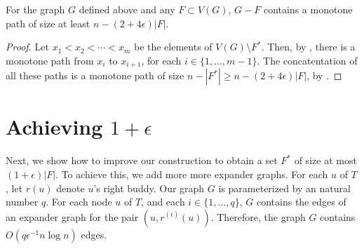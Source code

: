 \documentclass{patmorin}
\begin{document}
\begin{prop}
	For the graph $G$ defined above and any $F\subset V(G)$, $G-F$ contains a monotone path of size at least $n-(2+4\epsilon)|F|$.
\end{prop}

\begin{proof}
	Let $x_1<x_2<\cdots<x_m$ be the elements of $V(G)\setminus F^*$.
	Then, by , there is a monotone path from $x_i$
	to $x_{i+1}$, for each $i\in\{1,\ldots,m-1\}$.
	The concatentation of all these paths is a monotone path of size $n-|F^*| \ge n-(2+4\epsilon)|F|$, by .
\end{proof}

\section{Achieving $1+\epsilon$}


Next, we show how to improve our construction to obtain a set $F^*$
of size at most $(1+\epsilon)|F|$.  To achieve this, we add more more
expander graphs. For each $u$ of $T$, let $r(u)$ denote $u$'s right buddy.
Our graph $G$ is parameterized by an natural number $q$.  For each node
$u$ of $T$, and each $i\in\{1,\ldots,q\}$, $G$ contains the edges of an
expander graph for the pair $(u,r^{(i)}(u))$.  Therefore, the graph $G$
contains $O(q\epsilon^{-1} n\log n)$ edges.








\end{document}
